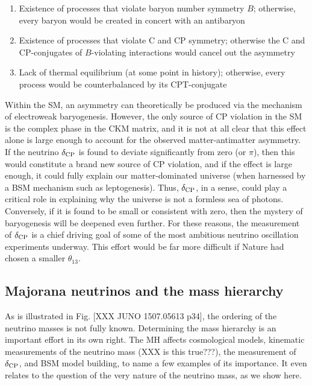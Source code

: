\documentclass[../thesis.tex]{subfiles}
\begin{document}
\begin{enumerate}
\item Existence of processes that violate baryon number symmetry $B$; otherwise, every baryon would be created in concert with an antibaryon
\item Existence of processes that violate C and CP symmetry; otherwise the C and CP-conjugates of $B$-violating interactions would cancel out the asymmetry
\item Lack of thermal equilibrium (at some point in history); otherwise, every process would be counterbalanced by its CPT-conjugate
\end{enumerate}

Within the SM, an asymmetry can theoretically be produced via the mechanism of electroweak baryogenesis. However, the only source of CP violation in the SM is the complex phase in the CKM matrix, and it is not at all clear that this effect alone is large enough to account for the observed matter-antimatter asymmetry. If the neutrino $\delta_\text{CP}$ is found to deviate significantly from zero (or $\pi$), then this would constitute a brand new source of CP violation, and if the effect is large enough, it could fully explain our matter-dominated universe (when harnessed by a BSM mechanism such as leptogenesis). Thus, $\delta_\text{CP}$, in a sense, could play a critical role in explaining why the universe is not a formless sea of photons. Conversely, if it is found to be small or consistent with zero, then the mystery of baryogenesis will be deepened even further. For these reasons, the measurement of $\delta_\text{CP}$ is a chief driving goal of some of the most ambitious neutrino oscillation experiments underway. This effort would be far more difficult if Nature had chosen a smaller $\theta_{13}$.

\subsection{Majorana neutrinos and the mass hierarchy}
\label{sec:majorana}

As is illustrated in Fig. [XXX JUNO 1507.05613 p34], the ordering of the neutrino masses is not fully known. Determining the mass hierarchy is an important effort in its own right. The MH affects cosmological models, kinematic measurements of the neutrino mass (XXX is this true???), the measurement of $\delta_\text{CP}$, and BSM model building, to name a few examples of its importance. It even relates to the question of the very nature of the neutrino mass, as we show here.
\end{document}
